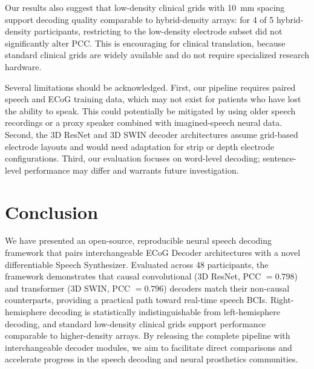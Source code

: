 \documentclass[10pt]{article}
\begin{document}
Our results also suggest that low-density clinical grids with 10~mm spacing support decoding quality comparable to hybrid-density arrays: for 4 of 5 hybrid-density participants, restricting to the low-density electrode subset did not significantly alter PCC. This is encouraging for clinical translation, because standard clinical grids are widely available and do not require specialized research hardware.

Several limitations should be acknowledged. First, our pipeline requires paired speech and ECoG training data, which may not exist for patients who have lost the ability to speak. This could potentially be mitigated by using older speech recordings or a proxy speaker combined with imagined-speech neural data. Second, the 3D ResNet and 3D SWIN decoder architectures assume grid-based electrode layouts and would need adaptation for strip or depth electrode configurations. Third, our evaluation focuses on word-level decoding; sentence-level performance may differ and warrants future investigation.

\section{Conclusion}

We have presented an open-source, reproducible neural speech decoding framework that pairs interchangeable ECoG Decoder architectures with a novel differentiable Speech Synthesizer. Evaluated across 48 participants, the framework demonstrates that causal convolutional (3D ResNet, PCC $=0.798$) and transformer (3D SWIN, PCC $=0.796$) decoders match their non-causal counterparts, providing a practical path toward real-time speech BCIs. Right-hemisphere decoding is statistically indistinguishable from left-hemisphere decoding, and standard low-density clinical grids support performance comparable to higher-density arrays. By releasing the complete pipeline with interchangeable decoder modules, we aim to facilitate direct comparisons and accelerate progress in the speech decoding and neural prosthetics communities.



\end{document}
